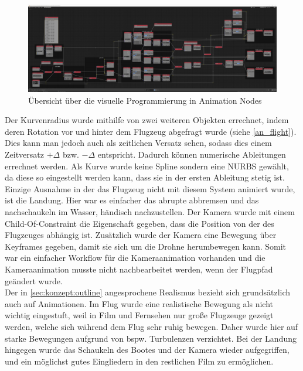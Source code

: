 \begin{figure}[H]
\begin{center}
\includegraphics[width=\textwidth]{gfx/prod/plane/animation_nodes.jpg}
\caption{Übersicht über die visuelle Programmierung in Animation Nodes}
\label{animation_nodes}
\end{center}
\end{figure}

Der Kurvenradius wurde mithilfe von zwei weiteren Objekten errechnet, indem deren Rotation vor und hinter dem Flugzeug abgefragt wurde (siehe \autoref{an_flight}). Dies kann man jedoch auch als zeitlichen Versatz sehen, sodass dies einem Zeitversatz $ +\Delta $ bzw. $ -\Delta $ entspricht. Dadurch können numerische Ableitungen errechnet werden.
Als Kurve wurde keine Spline sondern eine NURBS gewählt, da diese so eingestellt werden kann, dass sie in der ersten Ableitung stetig ist. Einzige Ausnahme in der das Flugzeug nicht mit diesem System animiert wurde, ist die Landung. Hier war es einfacher das abrupte abbremsen und das nachschaukeln im Wasser, händisch nachzustellen.
Der Kamera wurde mit einem Child-Of-Constraint die Eigenschaft gegeben, dass die Position von der des Flugzeuges abhängig ist. Zusätzlich wurde der Kamera eine Bewegung über Keyframes gegeben, damit sie sich um die Drohne herumbewegen kann. Somit war ein einfacher Workflow für die Kameraanimation vorhanden und die Kameraanimation musste nicht nachbearbeitet werden, wenn der Flugpfad geändert wurde.\\
Der in \autoref{sec:konzept:outline} angesprochene Realismus bezieht sich grundsätzlich auch auf Animationen. Im Flug wurde eine realistische Bewegung als nicht wichtig eingestuft, weil in Film und Fernsehen nur große Flugzeuge gezeigt werden, welche sich während dem Flug sehr ruhig bewegen. Daher wurde hier auf starke Bewegungen aufgrund von bspw. Turbulenzen verzichtet. Bei der Landung hingegen wurde das Schaukeln des Bootes und der Kamera wieder aufgegriffen, und ein möglichst gutes Eingliedern in den restlichen Film zu ermöglichen.

